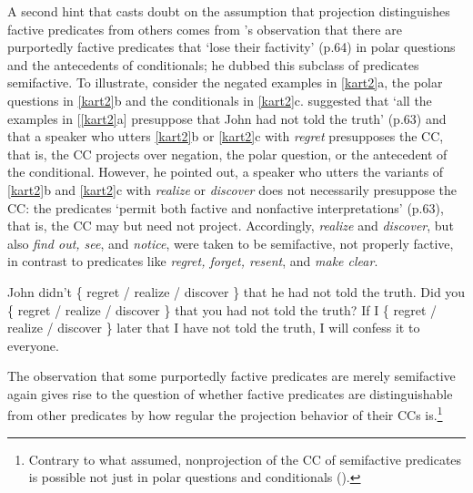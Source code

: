\documentclass{language}
\newcommand{\6}{\mbox{$[\hspace*{-.6mm}[$}}
\newcommand{\9}{\mbox{$]\hspace*{-.6mm}]$}}
\newcommand{\citepos}[1]{\citeauthor{#1}'s \citeyear{#1}}
\begin{document}
A second hint that casts doubt on the assumption that projection distinguishes factive predicates from others comes from \citepos{karttunen71b} observation that there are purportedly factive predicates that `lose their factivity' (p.64) in polar questions and the antecedents of conditionals; he dubbed this subclass of  predicates semifactive. To illustrate, consider the negated examples in \ref{kart2}a, the polar questions in \ref{kart2}b and the conditionals in \ref{kart2}c. \citet{karttunen71b} suggested that `all the examples in [\ref{kart2}a] presuppose that John had not told the truth' (p.63) and that a speaker who utters \ref{kart2}b or \ref{kart2}c with {\em regret} presupposes the CC, that is, the CC projects over negation, the polar question, or  the antecedent of the conditional. However, he pointed out, a speaker who utters the variants of \ref{kart2}b and \ref{kart2}c with {\em realize} or {\em discover} does not necessarily presuppose the CC: the predicates `permit both factive and nonfactive interpretations' (p.63), that is, the CC may but need not project. Accordingly, {\em realize} and {\em discover}, but also {\em find out, see}, and {\em notice}, were taken to be semifactive, not properly factive, in contrast to predicates like {\em regret, forget, resent}, and {\em make clear}.


\begin{exe}
\ex\label{kart2} \citealt[63f.]{karttunen71b}
\begin{xlist}
\ex John didn't \{ regret / realize / discover \} that he had not told the truth.
\ex  Did you \{ regret / realize / discover \} that you had not told the truth?
\ex  If I \{ regret / realize / discover \} later that I have not told the truth, I will confess it to everyone.
\end{xlist}
\end{exe}
The observation that some purportedly factive predicates are merely semifactive again gives rise to the question of whether factive predicates are distinguishable from other predicates by how regular the projection behavior of their CCs is.\footnote{Contrary to what \citealt{karttunen71b} assumed, nonprojection of the CC of semifactive predicates is possible not just in polar questions and conditionals (\citealt{beaver-belly}).}

\end{document}
